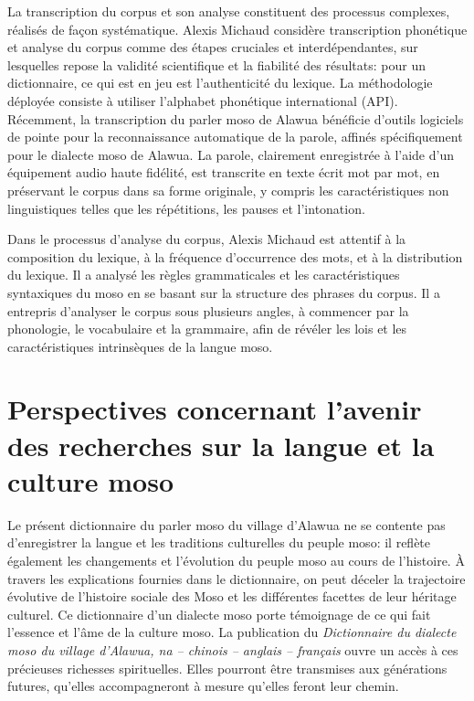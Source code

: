 La transcription du corpus et son analyse constituent des processus complexes, réalisés de façon systématique. Alexis Michaud considère transcription phonétique et analyse du corpus comme des étapes cruciales et interdépendantes, sur lesquelles repose la validité scientifique et la fiabilité des résultats: pour un dictionnaire, ce qui est en jeu est l'authenticité du lexique. La méthodologie déployée consiste à utiliser l'alphabet phonétique international (API). Récemment, la transcription du parler moso de Alawua bénéficie d’outils logiciels de pointe pour la reconnaissance automatique de la parole, affinés spécifiquement pour le dialecte moso de Alawua. La parole, clairement enregistrée à l'aide d'un équipement audio haute fidélité, est transcrite en texte écrit mot par mot, en préservant le corpus dans sa forme originale, y compris les caractéristiques non linguistiques telles que les répétitions, les pauses et l'intonation.

Dans le processus d'analyse du corpus, Alexis Michaud est attentif à la composition du lexique, à la fréquence d’occurrence des mots, et à la distribution du lexique. Il a analysé les règles grammaticales et les caractéristiques syntaxiques du moso en se basant sur la structure des phrases du corpus. Il a entrepris d’analyser le corpus sous plusieurs angles, à commencer par la phonologie, le vocabulaire et la grammaire, afin de révéler les lois et les caractéristiques intrinsèques de la langue moso.

\section*{Perspectives concernant l’avenir des recherches sur la langue et la culture moso}

Le présent dictionnaire du parler moso du village d'Alawua ne se contente pas d'enregistrer la langue et les traditions culturelles du peuple moso: il reflète également les changements et l'évolution du peuple moso au cours de l'histoire. À travers les explications fournies dans le dictionnaire, on peut déceler la trajectoire évolutive de l'histoire sociale des Moso et les différentes facettes de leur héritage culturel. Ce dictionnaire d’un dialecte moso porte témoignage de ce qui fait l'essence et l'âme de la culture moso. La publication du \emph{Dictionnaire du dialecte moso du village d'Alawua, na – chinois – anglais – français} ouvre un accès à ces précieuses richesses spirituelles. Elles pourront être transmises aux générations futures, qu’elles accompagneront à mesure qu’elles feront leur chemin.

